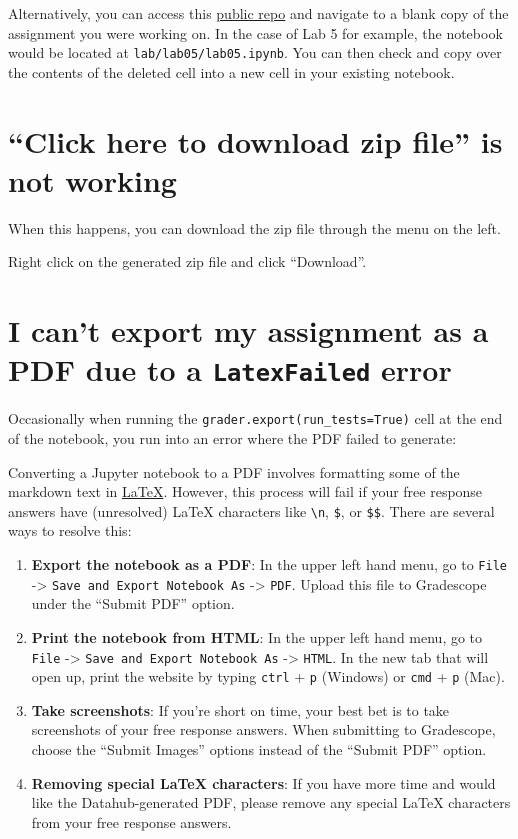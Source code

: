 \documentclass[
  letterpaper,
  DIV=11,
  numbers=noendperiod]{scrreprt}
\providecommand{\tightlist}{%
  \setlength{\itemsep}{0pt}\setlength{\parskip}{0pt}}\usepackage{longtable,booktabs,array}
\begin{document}
Alternatively, you can access this
\href{https://github.com/DS-100/sp24-student}{public repo} and navigate
to a blank copy of the assignment you were working on. In the case of
Lab 5 for example, the notebook would be located at
\texttt{lab/lab05/lab05.ipynb}. You can then check and copy over the
contents of the deleted cell into a new cell in your existing notebook.

\section{``Click here to download zip file'' is not
working}\label{click-here-to-download-zip-file-is-not-working}

When this happens, you can download the zip file through the menu on the
left.

Right click on the generated zip file and click ``Download''.

\section{\texorpdfstring{I can't export my assignment as a PDF due to a
\texttt{LatexFailed}
error}{I can't export my assignment as a PDF due to a LatexFailed error}}\label{i-cant-export-my-assignment-as-a-pdf-due-to-a-latexfailed-error}

Occasionally when running the \texttt{grader.export(run\_tests=True)}
cell at the end of the notebook, you run into an error where the PDF
failed to generate:

Converting a Jupyter notebook to a PDF involves formatting some of the
markdown text in \href{https://www.latex-project.org/}{LaTeX}. However,
this process will fail if your free response answers have (unresolved)
LaTeX characters like \texttt{\textbackslash{}n}, \texttt{\$}, or
\texttt{\$\$}. There are several ways to resolve this:

\begin{enumerate}
\def\labelenumi{\arabic{enumi}.}
\tightlist
\item
  \textbf{Export the notebook as a PDF}: In the upper left hand menu, go
  to \texttt{File} -\textgreater{}
  \texttt{Save\ and\ Export\ Notebook\ As} -\textgreater{} \texttt{PDF}.
  Upload this file to Gradescope under the ``Submit PDF'' option.
\item
  \textbf{Print the notebook from HTML}: In the upper left hand menu, go
  to \texttt{File} -\textgreater{}
  \texttt{Save\ and\ Export\ Notebook\ As} -\textgreater{}
  \texttt{HTML}. In the new tab that will open up, print the website by
  typing \texttt{ctrl} + \texttt{p} (Windows) or \texttt{cmd} +
  \texttt{p} (Mac).
\item
  \textbf{Take screenshots}: If you're short on time, your best bet is
  to take screenshots of your free response answers. When submitting to
  Gradescope, choose the ``Submit Images'' options instead of the
  ``Submit PDF'' option.
\item
  \textbf{Removing special LaTeX characters}: If you have more time and
  would like the Datahub-generated PDF, please remove any special LaTeX
  characters from your free response answers.
\end{enumerate}
\end{document}
